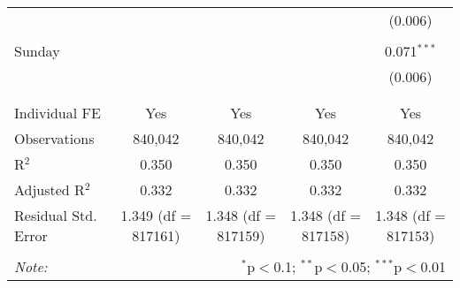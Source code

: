 \documentclass[
]{article}
\begin{document}
\begin{table}[!htbp]
{\begin{tabular}{@{\extracolsep{5pt}}lcccc}
  &  &  &  & (0.006) \\ 
  & & & & \\ 
 Sunday &  &  &  & 0.071$^{***}$ \\ 
  &  &  &  & (0.006) \\ 
  & & & & \\ 
\hline \\[-1.8ex] 
Individual FE & Yes & Yes & Yes & Yes \\ 
Observations & 840,042 & 840,042 & 840,042 & 840,042 \\ 
R$^{2}$ & 0.350 & 0.350 & 0.350 & 0.350 \\ 
Adjusted R$^{2}$ & 0.332 & 0.332 & 0.332 & 0.332 \\ 
Residual Std. Error & 1.349 (df = 817161) & 1.348 (df = 817159) & 1.348 (df = 817158) & 1.348 (df = 817153) \\ 
\hline 
\hline \\[-1.8ex] 
\textit{Note:}  & \multicolumn{4}{r}{$^{*}$p$<$0.1; $^{**}$p$<$0.05; $^{***}$p$<$0.01} \\ 
\end{tabular}
} 
\end{table} 
\newpage
\end{document}
